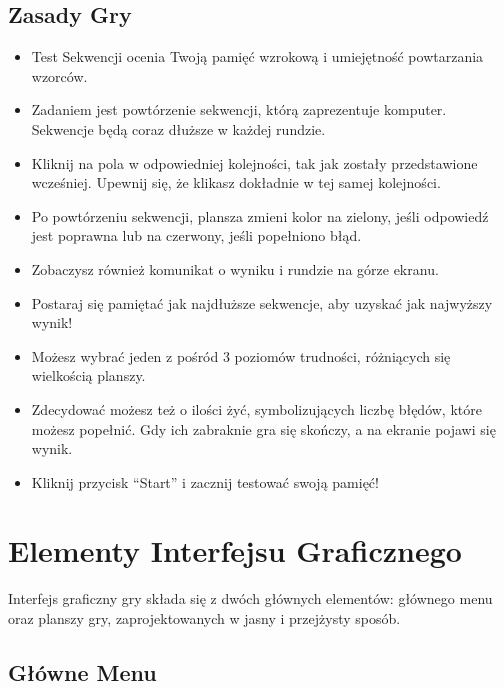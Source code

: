\documentclass[]{report}
\begin{document}
	
	\subsection*{Zasady Gry}
	
	\begin{itemize}
		\item Test Sekwencji ocenia Twoją pamięć wzrokową i umiejętność powtarzania wzorców.
		\item Zadaniem jest powtórzenie sekwencji, którą zaprezentuje komputer. Sekwencje będą coraz dłuższe w każdej rundzie.
		\item Kliknij na pola w odpowiedniej kolejności, tak jak zostały przedstawione wcześniej. Upewnij się, że klikasz dokładnie w tej samej kolejności.
		\item Po powtórzeniu sekwencji, plansza zmieni kolor na zielony, jeśli odpowiedź jest poprawna lub na czerwony, jeśli popełniono błąd.
		\item Zobaczysz również komunikat o wyniku i rundzie na górze ekranu.
		\item Postaraj się pamiętać jak najdłuższe sekwencje, aby uzyskać jak najwyższy wynik!
		\item Możesz wybrać jeden z pośród 3 poziomów trudności, różniących się wielkością planszy.
		\item Zdecydować możesz też o ilości żyć, symbolizujących liczbę błędów, które możesz popełnić. Gdy ich zabraknie gra się skończy, a na ekranie pojawi się wynik.
		\item Kliknij przycisk \enquote{Start} i zacznij testować swoją pamięć!
		
		
	\end{itemize}
\newpage
\section*{Elementy Interfejsu Graficznego}

Interfejs graficzny gry składa się z dwóch głównych elementów: głównego menu oraz planszy gry, zaprojektowanych w jasny i przejżysty sposób. 

\subsection*{Główne Menu}
\end{document}

